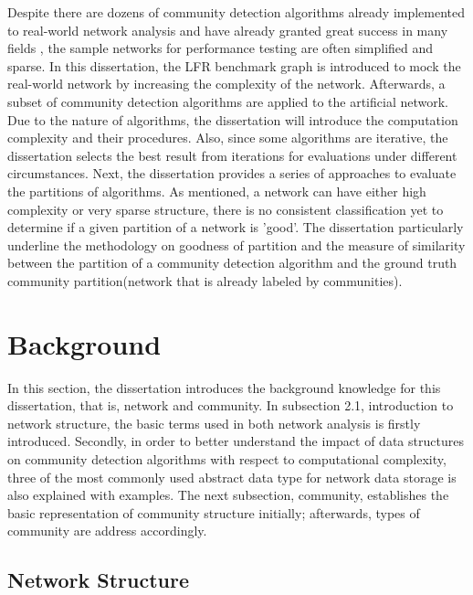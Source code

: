 \documentclass[12pt]{article}
\begin{document}
Despite there are dozens of community detection algorithms already implemented to real-world network analysis and have already granted great success in many fields \cite{2,3}, the sample networks for performance testing are often simplified and sparse. In this dissertation, the LFR benchmark graph is introduced to mock the real-world network by increasing the complexity of the network. Afterwards, a subset of community detection algorithms are applied to the artificial network. Due to the nature of algorithms, the dissertation will introduce the computation complexity and their procedures. Also, since some algorithms are iterative, the dissertation selects the best result from iterations for evaluations under different circumstances. Next, the dissertation provides a series of approaches to evaluate the partitions of algorithms. As mentioned, a network can have either high complexity or very sparse structure, there is no consistent classification yet to determine if a given partition of a network is 'good'. The dissertation particularly underline the methodology on goodness of partition and the measure of similarity between the partition of a community detection algorithm and the ground truth community partition(network that is already labeled by communities).

\section{Background}

In this section, the dissertation introduces the background knowledge for this dissertation, that is, network and community. In subsection 2.1, introduction to network structure, the basic terms used in both network analysis is firstly introduced. Secondly, in order to better understand the impact of data structures on community detection algorithms with respect to computational complexity, three of the most commonly used abstract data type for network data storage is also explained with examples. The next subsection, community, establishes the basic representation of community structure initially; afterwards, types of community are address accordingly.

\subsection{Network Structure}
\end{document}
